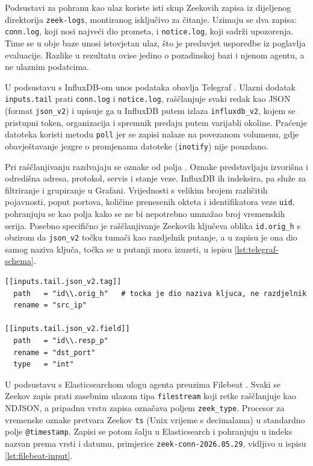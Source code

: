 Podsustavi za pohranu kao ulaz koriste isti skup Zeekovih zapisa iz dijeljenog direktorija \texttt{zeek-logs}, montiranog isključivo za čitanje. Uzimaju se dva zapisa:
\texttt{conn.log}, koji nosi najveći dio prometa, i \texttt{notice.log}, koji sadrži upozorenja. Time se u obje baze unosi istovjetan ulaz, što je preduvjet usporedbe iz poglavlja
evaluacije. Razlike u rezultatu ovise jedino o pozadinskoj bazi i njenom agentu, a ne ulaznim podatcima.

U podsustavu s InfluxDB-om unos podataka obavlja Telegraf \cite{telegraf_docs}. Ulazni dodatak \texttt{inputs.tail} prati \texttt{conn.log} i \texttt{notice.log}, raščlanjuje svaki
redak kao JSON (format \texttt{json\_v2}) i upisuje ga u InfluxDB putem izlaza \texttt{influxdb\_v2}, kojem se pristupni token, organizacija i spremnik predaju putem varijabli okoline.
Praćenje datoteka koristi metodu \texttt{poll} jer se zapisi nalaze na povezanom volumenu, gdje obavještavanje jezgre o promjenama datoteke (\texttt{inotify}) nije pouzdano.

Pri raščlanjivanju razdvajaju se oznake  od polja . Oznake predstavljaju izvorišna i odredišna adresa, protokol, servis i stanje veze. InfluxDB ih indeksira, pa služe za
filtriranje i grupiranje u Grafani. Vrijednosti s velikim brojem različitih pojavnosti, poput portova, količine prenesenih okteta i identifikatora veze \texttt{uid}, pohranjuju se kao
polja kako se ne bi nepotrebno umnažao broj vremenskih serija. Posebno specifično je raščlanjivanje Zeekovih ključeva oblika \texttt{id.orig\_h} s obzirom da \texttt{json\_v2} točku
tumači kao razdjelnik putanje, a u zapisu je ona dio samog naziva ključa, točka se u putanji mora izuzeti, u ispisu \ref{lst:telegraf-schema}.
\newpage
\begin{lstlisting}[caption={Izuzimanje točke u nazivu ključa (\texttt{telegraf.conf})}, label={lst:telegraf-schema}]
[[inputs.tail.json_v2.tag]]
  path   = "id\\.orig_h"   # tocka je dio naziva kljuca, ne razdjelnik
  rename = "src_ip"

[[inputs.tail.json_v2.field]]
  path   = "id\\.resp_p"
  rename = "dst_port"
  type   = "int"
\end{lstlisting}

U podsustavu s Elasticsearchom ulogu agenta preuzima Filebeat \cite{filebeat_docs}. Svaki se Zeekov zapis prati zasebnim ulazom tipa \texttt{filestream} koji retke raščlanjuje kao
NDJSON, a pripadnu vrstu zapisa označava poljem \texttt{zeek\_type}. Procesor za vremenske oznake pretvara Zeekov \texttt{ts} (Unix vrijeme s decimalama) u standardno polje
\texttt{@timestamp}. Zapisi se potom šalju u Elasticsearch i pohranjuju u indeks nazvan prema vrsti i datumu, primjerice \texttt{zeek-conn-2026.05.29}, vidljivo u ispisu \ref{lst:filebeat-input}.

